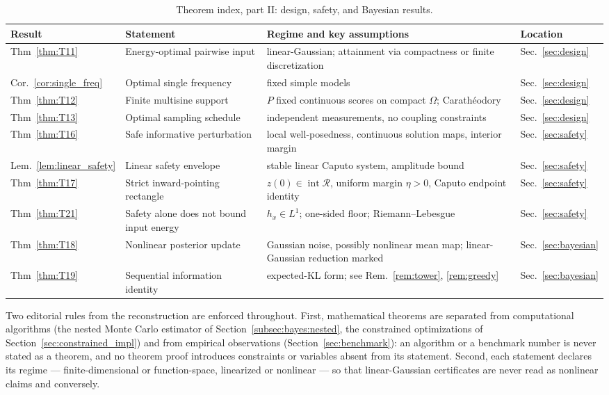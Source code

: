 \begin{table}[ht]
  \centering
  \scriptsize
  \begin{tabular}{p{1.15cm}p{2.1cm}p{4.85cm}p{1.95cm}}
    \hline
    Result & Statement & Regime and key assumptions & Location \\
    \hline
    Thm~\ref{thm:T11} & Energy-optimal pairwise input & linear-Gaussian; attainment via compactness or finite discretization & Sec.~\ref{sec:design} \\
    Cor.~\ref{cor:single_freq} & Optimal single frequency & fixed simple models & Sec.~\ref{sec:design} \\
    Thm~\ref{thm:T12} & Finite multisine support & $P$ fixed continuous scores on compact $\Omega$; Carath\'eodory & Sec.~\ref{sec:design} \\
    Thm~\ref{thm:T13} & Optimal sampling schedule & independent measurements, no coupling constraints & Sec.~\ref{sec:design} \\
    Thm~\ref{thm:T16} & Safe informative perturbation & local well-posedness, continuous solution maps, interior margin & Sec.~\ref{sec:safety} \\
    Lem.~\ref{lem:linear_safety} & Linear safety envelope & stable linear Caputo system, amplitude bound & Sec.~\ref{sec:safety} \\
    Thm~\ref{thm:T17} & Strict inward-pointing rectangle & $z(0)\in\operatorname{int}\mathcal{R}$, uniform margin $\eta>0$, Caputo endpoint identity & Sec.~\ref{sec:safety} \\
    Thm~\ref{thm:T21} & Safety alone does not bound input energy & $h_x\in L^1$; one-sided floor; Riemann--Lebesgue & Sec.~\ref{sec:safety} \\
    Thm~\ref{thm:T18} & Nonlinear posterior update & Gaussian noise, possibly nonlinear mean map; linear-Gaussian reduction marked & Sec.~\ref{sec:bayesian} \\
    Thm~\ref{thm:T19} & Sequential information identity & expected-KL form; see Rem.~\ref{rem:tower}, \ref{rem:greedy} & Sec.~\ref{sec:bayesian} \\
    \hline
  \end{tabular}
  \caption{Theorem index, part II: design, safety, and Bayesian results.}
  \label{tab:theorem_index2}
\end{table}

Two editorial rules from the reconstruction are enforced throughout. First, mathematical theorems are separated from computational algorithms (the nested Monte Carlo estimator of Section~\ref{subsec:bayes:nested}, the constrained optimizations of Section~\ref{sec:constrained_impl}) and from empirical observations (Section~\ref{sec:benchmark}): an algorithm or a benchmark number is never stated as a theorem, and no theorem proof introduces constraints or variables absent from its statement. Second, each statement declares its regime --- finite-dimensional or function-space, linearized or nonlinear --- so that linear-Gaussian certificates are never read as nonlinear claims and conversely.
